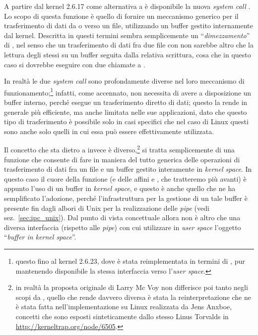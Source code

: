 A partire dal kernel 2.6.17 come alternativa a  è disponibile
la nuova \textit{system call} . Lo scopo di questa funzione è
quello di fornire un meccanismo generico per il trasferimento di dati da o
verso un file, utilizzando un buffer gestito internamente dal
kernel. Descritta in questi termini  sembra semplicemente un
``\textsl{dimezzamento}'' di , nel senso che un trasferimento
di dati fra due file con  non sarebbe altro che la lettura
degli stessi su un buffer seguita dalla relativa scrittura, cosa che in questo
caso si dovrebbe eseguire con due chiamate a .

In realtà le due \textit{system call} sono profondamente diverse nel loro
meccanismo di funzionamento;\footnote{questo fino al kernel 2.6.23, dove
   è stata reimplementata in termini di , pur
  mantenendo disponibile la stessa interfaccia verso l'\textit{user space}.}
 infatti, come accennato, non necessita di avere a disposizione
un buffer interno, perché esegue un trasferimento diretto di dati; questo la
rende in generale più efficiente, ma anche limitata nelle sue applicazioni,
dato che questo tipo di trasferimento è possibile solo in casi specifici che
nel caso di Linux questi sono anche solo quelli in cui essa può essere
effettivamente utilizzata.

Il concetto che sta dietro a  invece è diverso,\footnote{in
  realtà la proposta originale di Larry Mc Voy non differisce poi tanto negli
  scopi da , quello che rende  davvero diversa è
  stata la reinterpretazione che ne è stata fatta nell'implementazione su
  Linux realizzata da Jens Anxboe, concetti che sono esposti sinteticamente
  dallo stesso Linus Torvalds in \url{http://kerneltrap.org/node/6505}.} si
tratta semplicemente di una funzione che consente di fare in maniera del tutto
generica delle operazioni di trasferimento di dati fra un file e un buffer
gestito interamente in \textit{kernel space}. In questo caso il cuore della
funzione (e delle affini  e , che tratteremo più
avanti) è appunto l'uso di un buffer in \textit{kernel space}, e questo è
anche quello che ne ha semplificato l'adozione, perché l'infrastruttura per la
gestione di un tale buffer è presente fin dagli albori di Unix per la
realizzazione delle \textit{pipe} (vedi sez.~\ref{sec:ipc_unix}). Dal punto di
vista concettuale allora  non è altro che una diversa interfaccia
(rispetto alle \textit{pipe}) con cui utilizzare in \textit{user space}
l'oggetto ``\textsl{buffer in kernel space}''.

